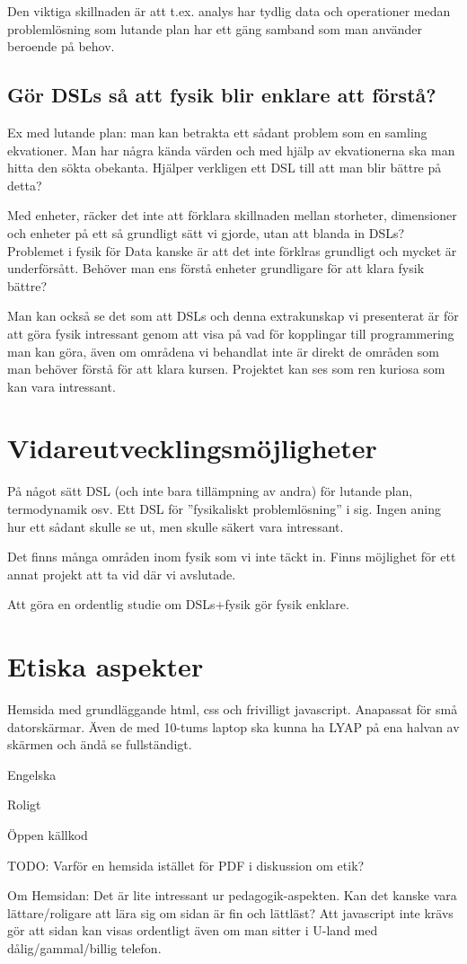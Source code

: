 \begin{binge}
Den viktiga skillnaden är att t.ex. analys har tydlig data och operationer
medan problemlösning som lutande plan har ett gäng samband som man använder
beroende på behov.

\subsection{Gör DSLs så att fysik blir enklare att förstå?}
\label{sec:bara_fysik}

Ex med lutande plan: man kan betrakta ett sådant problem som en samling
ekvationer. Man har några kända värden och med hjälp av ekvationerna ska man
hitta den sökta obekanta. Hjälper verkligen ett DSL till att man blir bättre på
detta?

Med enheter, räcker det inte att förklara skillnaden mellan storheter,
dimensioner och enheter på ett så grundligt sätt vi gjorde, utan att blanda in
DSLs? Problemet i fysik för Data kanske är att det inte förklras grundligt och
mycket är underförsått. Behöver man ens förstå enheter grundligare för att
klara fysik bättre?

Man kan också se det som att DSLs och denna extrakunskap vi presenterat är för
att göra fysik intressant genom att visa på vad för kopplingar till
programmering man kan göra, även om områdena vi behandlat inte är direkt de
områden som man behöver förstå för att klara kursen. Projektet kan ses som ren
kuriosa som kan vara intressant.

\section{Vidareutvecklingsmöjligheter}

På något sätt DSL (och inte bara tillämpning av andra) för lutande plan, termodynamik osv. Ett DSL för ''fysikaliskt problemlösning'' i sig. Ingen aning hur ett sådant skulle se ut, men skulle säkert vara intressant.

Det finns många områden inom fysik som vi inte täckt in. Finns möjlighet för ett
annat projekt att ta vid där vi avslutade.

Att göra en ordentlig studie om DSLs+fysik gör fysik enklare.

\section{Etiska aspekter}

Hemsida med grundläggande html, css och frivilligt javascript. Anapassat för små datorskärmar. Även de med 10-tums laptop ska kunna ha LYAP på ena halvan av skärmen och ändå se fullständigt.

Engelska

Roligt

Öppen källkod

TODO: Varför en hemsida istället för PDF i diskussion om etik?

Om Hemsidan: 
  Det är lite intressant ur pedagogik-aspekten. Kan det
  kanske vara lättare/roligare att lära sig om sidan är fin och
  lättläst? Att javascript inte krävs gör att sidan kan visas ordentligt
  även om man sitter i U-land med dålig/gammal/billig telefon.


\end{binge}
